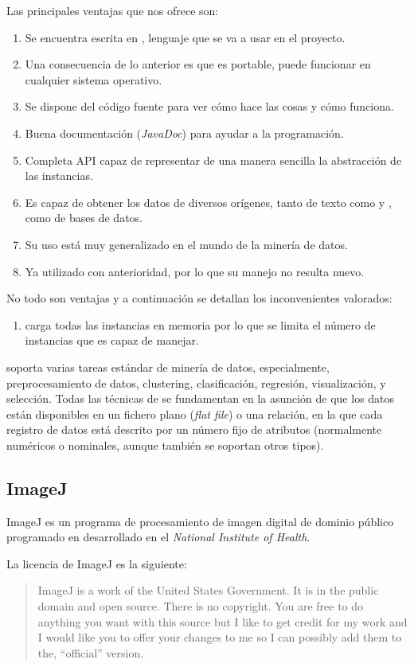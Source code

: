 Las principales ventajas que nos ofrece son:
\begin{enumerate}
 \item Se encuentra escrita en \java{}, lenguaje que se va a usar en el proyecto.
 \item Una consecuencia de lo anterior es que \weka{} es portable, puede funcionar en cualquier sistema operativo.
 \item Se dispone del código fuente para ver cómo hace las cosas y cómo funciona.
 \item Buena documentación (\textit{JavaDoc}) para ayudar a la programación.
 \item Completa API capaz de representar de una manera sencilla la abstracción de las instancias.
 \item Es capaz de obtener los datos de diversos orígenes, tanto de texto como \arff{} y \csv{}, como de bases de datos.
 \item Su uso está muy generalizado en el mundo de la minería de datos.
 \item Ya utilizado con anterioridad, por lo que su manejo no resulta nuevo.
\end{enumerate}
No todo son ventajas y a continuación se detallan los inconvenientes valorados:
\begin{enumerate}
 \item \weka{} carga todas las instancias en memoria por lo que se limita el número de instancias que es capaz de manejar.
\end{enumerate}

\weka{} soporta varias tareas estándar de minería de datos, especialmente, preprocesamiento de
datos, clustering, clasificación, regresión, visualización, y selección. Todas las técnicas de \weka{} se fundamentan en la asunción de que los datos están disponibles en un fichero plano (\emph{flat file}) o una relación, en la que cada registro de datos está descrito por un número fijo de atributos (normalmente numéricos o nominales, aunque también se soportan otros tipos).


\subsection{ImageJ}
ImageJ \cite{abramoff04} es un programa de procesamiento de imagen digital de dominio público programado en \java{} desarrollado en el \emph{National Institute of Health}.

La licencia de ImageJ es la siguiente:

\begin{quotation}
ImageJ is a work of the United States Government. It is in the public domain and
open source. There is no copyright. You are free to do anything you want with this
source but I like to get credit for my work and I would like you to offer your changes
to me so I can possibly add them to the, “official” version.
\end{quotation}

